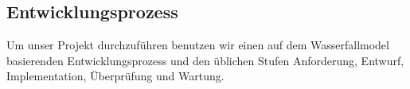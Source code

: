 \subsection{Entwicklungsprozess}
\label{sec:Entwicklungsprozess}

Um unser Projekt durchzuführen benutzen wir einen auf dem Wasserfallmodel basierenden Entwicklungsprozess und den üblichen Stufen Anforderung, Entwurf, Implementation, Überprüfung und Wartung.
